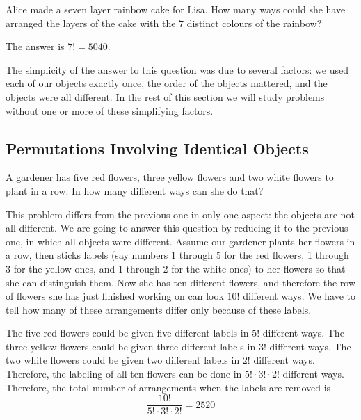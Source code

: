 \documentclass[11pt,a4paper]{book}
\begin{document}
\begin{example}

Alice made a seven layer rainbow cake for Lisa. How many ways could
she have arranged the layers of the cake with the $7$ distinct colours
of the rainbow?

\Solution

The answer is $7!=5040$.

\end{example}

The simplicity of the answer to this question was due to several
factors: we used each of our objects exactly once, the order of the
objects mattered, and the objects were all different. In the rest
of this section we will study problems without one or more of these
simplifying factors.

\subsection{Permutations Involving Identical Objects}

\begin{example}

A gardener has five red flowers, three yellow flowers and two white
flowers to plant in a row. In how many different ways can she do that?

\Solution

This problem differs from the previous one in only one aspect: the
objects are not all different. We are going to answer this question
by reducing it to the previous one, in which all objects were different.
Assume our gardener plants her flowers in a row, then sticks labels
(say numbers 1 through 5 for the red flowers, 1 through 3 for the
yellow ones, and 1 through 2 for the white ones) to her flowers so
that she can distinguish them. Now she has ten different flowers,
and therefore the row of flowers she has just finished working on
can look $10!$ different ways. We have to tell how many of these
arrangements differ only because of these labels.

The five red flowers could be given five different labels in $5!$
different ways. The three yellow flowers could be given three different
labels in $3!$ different ways. The two white flowers could be given
two different labels in $2!$ different ways. Therefore, the labeling
of all ten flowers can be done in $5!\cdot3!\cdot2!$ different ways.
Therefore, the total number of arrangements when the labels are removed
is
\[
\frac{10!}{5!\cdot3!\cdot2!}=2520
\]

\end{example}
\end{document}
